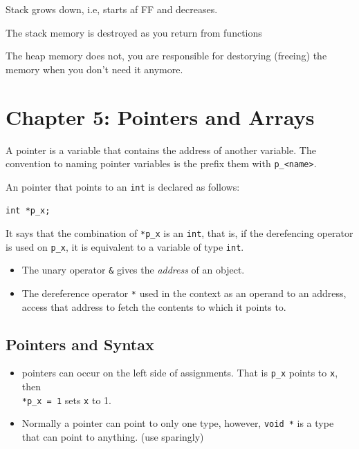 \documentclass[12pt]{article}
\begin{document}

Stack grows down, i.e, starts af FF and decreases.

The stack memory is destroyed as you return from functions

The heap memory does not, you are responsible for destorying (freeing) the memory when you don't need it anymore.


\section*{Chapter 5: Pointers and Arrays}
\begin{definition}[Pointer]
    A pointer is a variable that contains the address of another variable. The convention to naming pointer variables is the prefix them with \lstinline|p_<name>|.

    An pointer that points to an \lstinline|int| is declared as follows:

    \lstinline{int *p_x;}

    It says that the combination of \lstinline|*p_x| is an \lstinline|int|, that is, if the derefencing operator is used on \lstinline|p_x|, it is equivalent to a variable of type \lstinline|int|.
\end{definition}


\begin{itemize}
    \item The unary operator \lstinline|&| gives the \emph{address} of an object.
    \item The dereference operator \lstinline|*| used in the context as an operand to an address, access that address to fetch the contents to which it points to.
\end{itemize}






\subsection*{Pointers and Syntax}
\begin{itemize}
    \item pointers can occur on the left side of assignments. That is \lstinline{p_x} points to \lstinline{x}, then \\ \lstinline{*p_x = 1} sets \lstinline{x} to 1.
    \item Normally a pointer can point to only one type, however, \lstinline{void *} is a type that can point to anything. (use sparingly)
\end{itemize}
\end{document}
